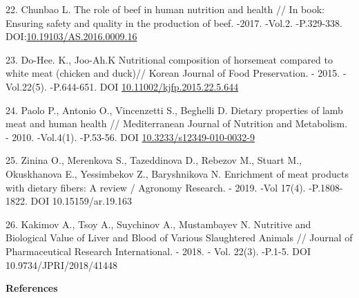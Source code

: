 \begin{references}
22. Chunbao L. The role of beef in human nutrition and health // In book:
Ensuring safety and quality in the production of beef. -2017. -Vol.2.
-P.329-338.
DOI:\href{http://dx.doi.org/10.19103/AS.2016.0009.16}{10.19103/AS.2016.0009.16}

23. Do-Hee. K., Joo-Ah.K Nutritional composition of horsemeat compared to
white meat (chicken and duck)// Korean Journal of Food Preservation. -
2015. -Vol.22(5). -P.644-651. DOI
\href{http://dx.doi.org/10.11002/kjfp.2015.22.5.644}{10.11002/kjfp.2015.22.5.644}

24. Paolo P., Antonio O., Vincenzetti S., Beghelli D. Dietary properties
of lamb meat and human health // Mediterranean Journal of Nutrition
and Metabolism. - 2010. -Vol.4(1). -P.53-56. DOI
\href{https://doi.org/10.3233/s12349-010-0032-9}{10.3233/s12349-010-0032-9}

25. Zinina O., Merenkova S., Tazeddinova D., Rebezov M., Stuart M.,
Okuskhanova E., Yessimbekov Z., Baryshnikova N. Enrichment of meat
products with dietary fibers: A review / Agronomy Research. - 2019.
-Vol 17(4). -P.1808-1822. DOI 10.15159/ar.19.163

26. Kakimov A., Tsoy A., Suychinov A., Mustambayev N. Nutritive and
Biological Value of Liver and Blood of Various Slaughtered Animals //
Journal of Pharmaceutical Research International. - 2018. - Vol.
22(3). -P.1-5. DOI 10.9734/JPRI/2018/41448
\end{references}

\begin{center}
{\bfseries References}
\end{center}


